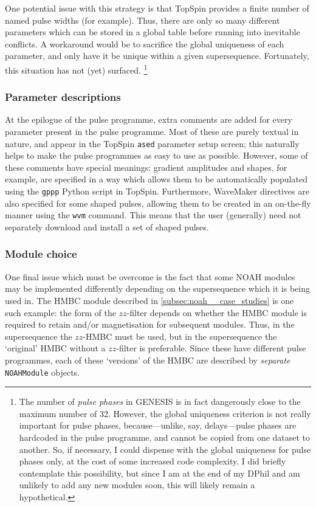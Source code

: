 One potential issue with this strategy is that TopSpin provides a finite number of named pulse widths (for example).
Thus, there are only so many different parameters which can be stored in a global table before running into inevitable conflicts.
A workaround would be to sacrifice the global uniqueness of each parameter, and only have it be unique within a given supersequence.
Fortunately, this situation has not (yet) surfaced.%
\footnote{The number of \textit{pulse phases} in GENESIS is in fact dangerously close to the maximum number of 32. However, the global uniqueness criterion is not really important for pulse phases, because---unlike, say, delays---pulse phases are hardcoded in the pulse programme, and cannot be copied from one dataset to another. So, if necessary, I could dispense with the global uniqueness for pulse phases only, at the cost of some increased code complexity. I did briefly contemplate this possibility, but since I am at the end of my DPhil and am unlikely to add any new modules soon, this will likely remain a hypothetical.}


\subsubsection{Parameter descriptions}

At the epilogue of the pulse programme, extra comments are added for every parameter present in the pulse programme.
Most of these are purely textual in nature, and appear in the TopSpin \texttt{ased} parameter setup screen; this naturally helps to make the pulse programmes as easy to use as possible.
However, some of these comments have special meanings: gradient amplitudes and shapes, for example, are specified in a way which allows them to be automatically populated using the \texttt{gppp} Python script in TopSpin.
Furthermore, WaveMaker directives are also specified for some shaped pulses, allowing them to be created in an on-the-fly manner using the \texttt{wvm} command.
This means that the user (generally) need not separately download and install a set of shaped pulses.

\subsubsection{Module choice}

One final issue which must be overcome is the fact that some NOAH modules may be implemented differently depending on the supersequence which it is being used in.
The HMBC module described in \cref{subsec:noah__case_studies} is one such example: the form of the $zz$-filter depends on whether the HMBC module is required to retain  and/or  magnetisation for subsequent modules.
Thus, in the  supersequence the $zz$-HMBC must be used, but in the  supersequence the `original' HMBC without a $zz$-filter is preferable.
Since these have different pulse programmes, each of these `versions' of the HMBC are described by \textit{separate} \texttt{NOAHModule} objects.

